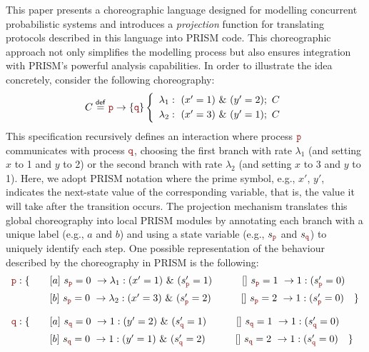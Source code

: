 This paper presents a choreographic language designed for modelling
concurrent probabilistic systems and introduces a {\em projection}
function for translating protocols described in this language into
PRISM code. This choreographic approach not only simplifies the
modelling process but also ensures integration with PRISM's powerful
analysis capabilities.
%
In order to illustrate the idea concretely, consider the following
choreography:
%
\[
  \begin{array}{lll}
    C \stackrel{\mathsf{def}}{=} \interactBase{\nr}{\nrr}
    \left\{
    \begin{array}{lll}
      \lambda_1: \ (x'=1)\ \&\ (y'=2);\ C\\[1mm]
      \lambda_2: \ (x'=3)\ \&\ (y'=1);\ C
    \end{array}
    \right.
  \end{array}
\]
%
This specification recursively defines an interaction where process
\(\role{p}\) communicates with process \(\role{q}\), choosing the
first branch with rate $\lambda_1$ (and setting \(x\) to 1 and \(y\)
to 2) or the second branch with rate $\lambda_2$ (and setting \(x\) to
3 and \(y\) to 1). Here, we adopt PRISM notation where the prime
symbol, e.g., $x'$, $y'$, indicates the next-state value of the
corresponding variable, that is, the value it will take after the
transition occurs.
% 
The projection mechanism translates this global choreography into
local PRISM modules by annotating each branch with a unique label
(e.g., $a$ and $b$) and using a state variable (e.g., \(s_{\role p}\)
and \(s_{\role q}\)) to uniquely identify each step.
%
One possible representation of the behaviour described by the
choreography in PRISM is the following:
%
\[
\begin{array}{llll}
\role{p}: \{ & \quad \commandBase {a}{s_{\role p}=0} {\lambda_1:(x'=1)\ \&\ (s_{\role p}'=1)} \quad\qquad \commandBase {}{s_{\role p}=1} {1:(s_{\role p}'=0)}\\[2mm]
              & \quad \commandBase {b}{s_{\role p}=0} {\lambda_2:(x'=3)\ \&\ (s_{\role p}'=2)} \quad\qquad \commandBase {}{s_{\role p}=2} {1:(s_{\role p}'=0)} \quad \}\\[4mm]
\role{q}: \{ & \quad \commandBase {a}{s_{\role q}=0} {1:(y'=2)\ \&\ (s_{\role q}'=1)} \qquad\quad \commandBase {}{s_{\role q}=1} {1:(s_{\role q}'=0)}\\[2mm]
              & \quad \commandBase {b}{s_{\role q}=0} {1:(y'=1)\ \&\ (s_{\role q}'=2)} \qquad\quad \commandBase {}{s_{\role q}=2} {1:(s_{\role q}'=0)} \quad \}\\
\end{array}
\]
